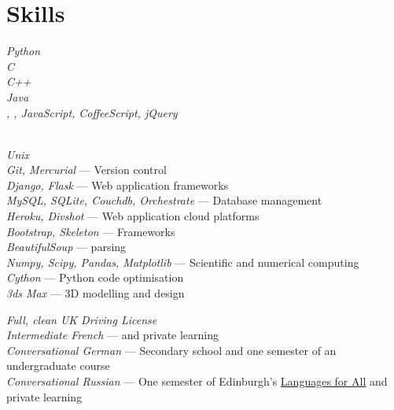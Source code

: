 \documentclass[10pt]{article}
\begin{document}


    \newpage

    \section{Skills}

        {
            \textit{Python}\\
            \textit{C}\\
            \textit{C++}\\
            \textit{Java}\\
            \textit{, , JavaScript, CoffeeScript, jQuery}\\
            \textit{}\\
        }

        {
            \textit{Unix}\\
            \textit{Git, Mercurial} --- Version control\\
            \textit{Django, Flask} --- Web application frameworks\\
            \textit{MySQL, SQLite, Couchdb, Orchestrate} --- Database management\\
            \textit{Heroku, Divshot} --- Web application cloud platforms\\
            \textit{Bootstrap, Skeleton} ---  Frameworks\\
            \textit{BeautifulSoup} ---  parsing\\
            \textit{Numpy, Scipy, Pandas, Matplotlib} --- Scientific and numerical computing\\
            \textit{Cython} --- Python code optimisation\\
            \textit{3ds Max} --- 3D modelling and design
        }


        {
            \textit{Full, clean UK Driving License}\\
            \textit{Intermediate French} ---   and private learning\\
            \textit{Conversational German} --- Secondary school and one semester of an undergraduate course\\
            \textit{Conversational Russian} --- One semester of Edinburgh's \href{http://www.ed.ac.uk/studying/short-courses/languages/for-all}{Languages for All} and private learning
        }
\end{document}
